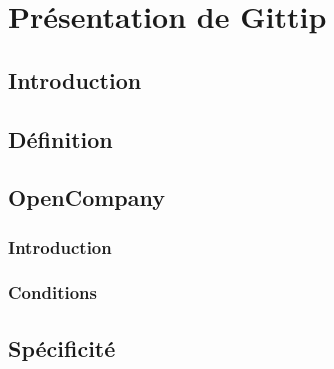 \chapter{Présentation de Gittip}
    \section{Introduction}

    \section{Définition}

    \section{OpenCompany}
    \subsection{Introduction}
    \subsection{Conditions}

    \section{Spécificité}
